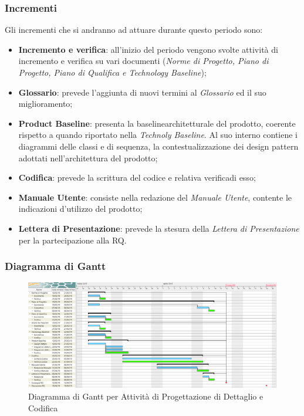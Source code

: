 \subsubsection{Incrementi}
Gli incrementi che si andranno ad attuare durante questo periodo sono:
\begin{itemize}
	\item \textbf{Incremento e verifica}: all'inizio del periodo vengono svolte attività di incremento e verifica su vari documenti (\textit{Norme di Progetto, Piano di Progetto, Piano di Qualifica e Technology Baseline});
	\item \textbf{Glossario}: prevede l'aggiunta di nuovi termini al \textit{Glossario} ed il suo miglioramento;
	\item \textbf{Product Baseline}\glossario: presenta la baseline\glossario architetturale del prodotto, coerente rispetto a quando riportato nella \textit{Technoly Baseline}. Al suo interno contiene i diagrammi delle classi e di sequenza, la contestualizzazione dei design pattern adottati nell'architettura del prodotto; 
	\item \textbf{Codifica}: prevede la scrittura del codice e relativa verifica\glossario di esso;
	\item \textbf{Manuale Utente}: consiste nella redazione del \textit{Manuale Utente}, contente le indicazioni d'utilizzo del prodotto;
	\item \textbf{Lettera di Presentazione}: prevede la stesura della \textit{Lettera di Presentazione} per la partecipazione alla RQ.
\end{itemize}


\begin{landscape}
\subsubsection{Diagramma di Gantt}
\begin{figure}[h]
	\centering
  		\includegraphics[width=1.0\linewidth]{./images/DettaglioeCodifica.png}
  		\caption{Diagramma di Gantt per Attività di Progettazione di Dettaglio e Codifica}
  		\label{fig:Gantt Progettazione di dettaglio e codifica}
\end{figure}
\end{landscape}

